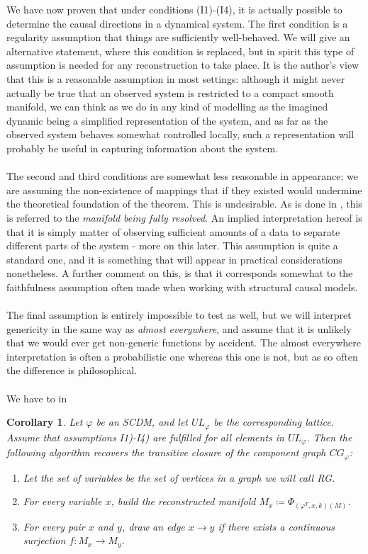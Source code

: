 \documentclass[11pt, a4paper]{memoir}
\theoremstyle{break}
\newtheorem{cor}{Corollary}
\theoremstyle{break}
\theoremstyle{nonumberplain}
\begin{document}
We have now proven that under conditions (I1)-(I4), it is actually possible to determine the causal directions in a dynamical system. The first condition is a regularity assumption that things are sufficiently well-behaved. We will give an alternative statement, where this condition is replaced, but in spirit this type of assumption is needed for any reconstruction to take place. It is the author's view that this is a reasonable assumption in most settings: although it might never actually be true that an observed system is restricted to a compact smooth manifold, we can think as we do in any kind of modelling as the imagined dynamic being a simplified representation of the system, and as far as the observed system behaves somewhat controlled locally, such a representation will probably be useful in capturing information about the system.\\\\ The second and third conditions are somewhat less reasonable in appearance; we are assuming the non-existence of mappings that if they existed would undermine the theoretical foundation of the theorem. This is undesirable. As is done in \cite{mathFound}, this is referred to the \textit{manifold being fully resolved}. An implied interpretation hereof is that it is simply matter of observing sufficient amounts of a data to separate different parts of the system - more on this later. This assumption is quite a standard one, and it is something that will appear in practical considerations nonetheless. A further comment on this, is that it corresponds somewhat to the faithfulness assumption often made when working with structural causal models.\\\\ The final assumption is entirely impossible to test as well, but we will interpret genericity in the same way as \textit{almost everywhere}, and assume that it is unlikely that we would ever get non-generic functions by accident. The almost everywhere interpretation is often a probabilistic one whereas this one is not, but as so often the difference is philosophical.\\\\
We have to in
\begin{cor}
Let $\varphi$ be an SCDM, and let $UL_\varphi$ be the corresponding lattice. Assume that assumptions I1)-I4) are fulfilled for all elements in $UL_\varphi$. Then the following algorithm recovers the transitive closure of the component graph $CG_\varphi$:
\begin{enumerate}[label=\roman*.]
	\item Let the set of variables be the set of vertices in a graph we will call \emph{RG}.
	\item For every variable $x$, build the reconstructed manifold $M_x\coloneqq \Phi	_{(\varphi^T,x,k)(M)}$.
	\item For every pair $x$ and $y$, draw an edge $x\to y$ if there exists a continuous surjection $f:M_x\to M_y$.
\end{enumerate}
\end{cor}
\end{document}

